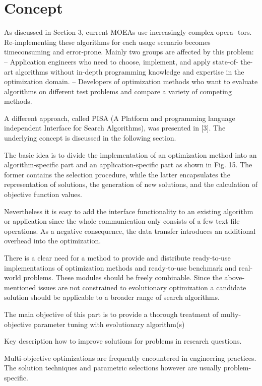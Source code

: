\chapter{Concept}

    As discussed in Section 3, current MOEAs use increasingly complex opera- tors. Re-implementing these algorithms for each usage scenario becomes 
    timeconsuming and error-prone. Mainly two groups are affected by this problem:
    – Application engineers who need to choose, implement, and apply state-of- the-art algorithms without in-depth programming knowledge and expertise in the optimization domain.
    – Developers of optimization methods who want to evaluate algorithms on different test problems and compare a variety of competing methods.


    A different approach, called PISA (A Platform and programming language independent Interface for Search Algorithms), was presented in [3]. 
    The underlying concept is discussed in the following section.

    The basic idea is to divide the implementation of an optimization method into an algorithm-specific part and an application-specific part as shown in Fig. 15. 
    The former contains the selection procedure, while the latter encapsulates the representation of solutions, the generation of new solutions, 
    and the calculation of objective function values.

    Nevertheless it is easy to add the interface functionality to an existing algorithm or application since the whole communication only consists of a few text file operations.
    As a negative consequence, the data transfer introduces an additional overhead into the optimization.

    There is a clear need for a method to provide and distribute ready-to-use implementations of optimization methods and ready-to-use benchmark and real- world problems. 
    These modules should be freely combinable. Since the above- mentioned issues are not constrained to evolutionary optimization a 
    candidate solution should be applicable to a broader range of search algorithms.


    The main objective of this part is to provide a thorough treatment of multy-objective parameter tuning with evolutionary algorithm(s)


    Key description how to improve solutions for problems in research questions.

    Multi-objective optimizations are frequently encountered in
    engineering practices. The solution techniques and parametric
    selections however are usually problem-specific. \cite{DBLP:journals/corr/abs-1812-07958}

